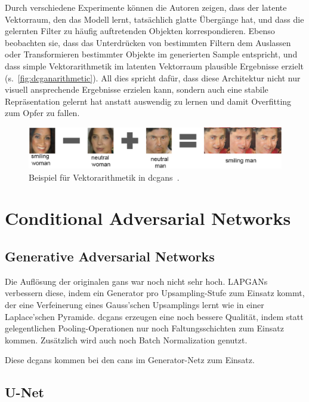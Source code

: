 Durch verschiedene Experimente können die Autoren zeigen, dass der latente Vektorraum, den das Modell lernt, tatsächlich glatte Übergänge hat, und dass die gelernten Filter zu häufig auftretenden Objekten korrespondieren.
Ebenso beobachten sie, dass das Unterdrücken von bestimmten Filtern dem Auslassen oder Transformieren bestimmter Objekte im generierten Sample entspricht, und dass simple Vektorarithmetik im latenten Vektorraum plausible Ergebnisse erzielt (s.~\autoref{fig:dcganarithmetic}).
All dies spricht dafür, dass diese Architektur nicht nur visuell ansprechende Ergebnisse erzielen kann, sondern auch eine stabile Repräsentation gelernt hat anstatt auswendig zu lernen und damit Overfitting zum Opfer zu fallen.

\begin{figure}
	\centering
	\includegraphics[width=0.9\linewidth]{img/dcgan_arithmetic}
	\caption{Beispiel für Vektorarithmetik in \glspl{dcgan}~\cite{Radford.2016}.}
	\label{fig:dcganarithmetic}
\end{figure}



\section{Conditional Adversarial Networks}

\subsection{Generative Adversarial Networks}

Die Auflösung der originalen \glspl{gan} war noch nicht sehr hoch.
LAPGANs verbessern diese, indem ein Generator pro Upsampling-Stufe zum Einsatz kommt, der eine Verfeinerung eines Gauss'schen Upsamplings lernt wie in einer Laplace'schen Pyramide.
\glspl{dcgan} erzeugen eine noch bessere Qualität, indem statt gelegentlichen Pooling-Operationen nur noch Faltungsschichten zum Einsatz kommen.
Zusätzlich wird auch noch Batch Normalization genutzt.

Diese \glspl{dcgan} kommen bei den \glspl{can} im Generator-Netz zum Einsatz.

\subsection{U-Net}

